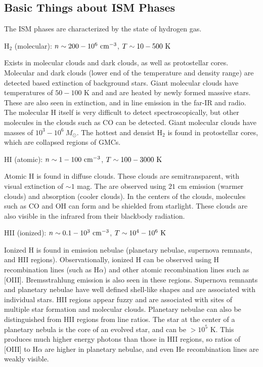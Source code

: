 \subsection{Basic Things about ISM Phases}

The ISM phases are characterized by the state of hydrogen gas.

H$_2$ (molecular): $n \sim 200-10^6~{\rm cm}^{-3}$, $T \sim 10-500~{\rm K}$

Exists in molecular clouds and dark clouds, as well as protostellar cores.  
Molecular and dark clouds (lower end of the temperature and density range) are 
detected based extinction of background stars.  Giant molecular clouds 
have temperatures of $50-100$ K and and are heated by newly formed massive 
stars.  These are also seen in extinction, and in line emission in the far-IR 
and radio.  The molecular H itself is very difficult to detect 
spectroscopically, but other molecules in the clouds such as CO can be 
detected.  Giant molecular clouds have masses of 
$10^3-10^6\ M_{\odot}$.  The hottest and densist H$_2$ is found in protostellar 
cores, which are collapsed regions of GMCs.  

HI (atomic): $n \sim 1-100~{\rm cm}^{-3}$, $T \sim 100-3000~{\rm K}$

Atomic H is found in diffuse clouds.  These clouds are semitransparent, with 
visual extinction of $\sim1$ mag.  The are observed using $21$ cm emission 
(warmer clouds) and absorption (cooler clouds).  In the centers of the clouds, 
molecules such as CO and OH can form and be shielded from starlight.  These 
clouds are also visible in the infrared from their blackbody radiation.  
 
HII (ionized): $n \sim 0.1-10^3~{\rm cm}^{-3}$, $T \sim 10^4-10^6~{\rm K}$

Ionized H is found in emission nebulae (planetary nebulae, supernova remnants, 
and HII regions).  Observationally, ionized H can be observed using H 
recombination lines (such as H$\alpha$) and other atomic recombination lines 
such as [OIII].  Bremsstrahlung emission is also seen in these regions.  
Supernova remnants and planetary nebulae have well defined shell-like shapes 
and are associated with individual stars.  HII regions appear fuzzy and 
are associated with sites of multiple star formation and molecular clouds.  
Planetary nebulae can also be distinguished from HII regions from line ratios.  
The star at the center of a planetary nebula is the core of an evolved star, 
and can be $>10^5$ K.  This produces much higher energy photons than those 
in HII regions, so ratios of [OIII] to H$\alpha$ are higher in planetary 
nebulae, and even He recombination lines are weakly visible.  

